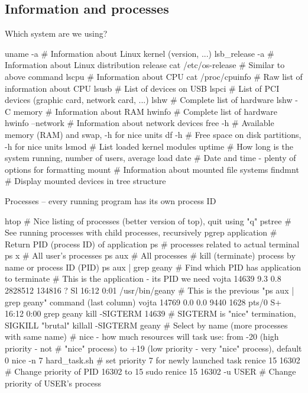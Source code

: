 \documentclass[compress, ucs, xelatex, 11pt, xcolor=svgnames,
  hyperref={
    bookmarks=true,
    unicode=true,
    colorlinks=true,
    pdftitle={Linux, command line and MetaCentrum},
    plainpages=false,
    pdfauthor={Vojtech Zeisek},
    pdfsubject={Course about use of Linux command line, writing shell scripts and using MetaCentrum of CESNET},
    pdfcreator={XeLaTeX},
    pdfkeywords={Linux, GNU, BASH, shell, command line, MetaCentrum},
    linkcolor=DarkRed,
    anchorcolor=DarkBlue,
    citecolor=Indigo,
    filecolor=NavyBlue,
    menucolor=DarkMagenta,
    urlcolor=DarkBlue,
    pdftex},
  url={hyphens, lowtilde} %
  ]{beamer}
\begin{document}
\subsection{Information and processes}

\begin{frame}[fragile]{Which system are we using?}
  \begin{bashcode}
    uname -a # Information about Linux kernel (version, ...)
    lsb_release -a # Information about Linux distribution release
    cat /etc/os-release # Similar to above command
    lscpu # Information about CPU
    cat /proc/cpuinfo # Raw list of information about CPU
    lsusb # List of devices on USB
    lspci # List of PCI devices (graphic card, network card, ...)
    lshw # Complete list of hardware
    lshw -C memory # Information about RAM
    hwinfo # Complete list of hardware
    hwinfo --network # Information about network devices
    free -h # Available memory (RAM) and swap, -h for nice units
    df -h # Free space on disk partitions, -h for nice units
    lsmod # List loaded kernel modules
    uptime # How long is the system running, number of users, average load
    date # Date and time - plenty of options for formatting
    mount # Information about mounted file systems
    findmnt # Display mounted devices in tree structure
  \end{bashcode}
\end{frame}

\begin{frame}[fragile]{Processes -- every running program has its own process ID}
  \begin{bashcode}
    htop # Nice listing of processes (better version of top), quit using "q"
    pstree # See running processes with child processes, recursively
    pgrep application # Return PID (process ID) of application
    ps # processes related to actual terminal
    ps x # All user's processes
    ps aux # All processes
    # kill (terminate) process by name or process ID (PID)
    ps aux | grep geany # Find which PID has application to terminate
    # This is the application - its PID we need
    vojta 14639 9.3 0.8 2828512 134816 ?   Sl 16:12 0:01 /usr/bin/geany
    # This is the previous "ps aux | grep geany" command (last column)
    vojta 14769 0.0 0.0   9440  1628 pts/0 S+ 16:12 0:00 grep geany
    kill -SIGTERM 14639 # SIGTERM is "nice" termination, SIGKILL "brutal"
    killall -SIGTERM geany # Select by name (more processes with same name)
    # nice - how much resources will task use: from -20 (high priority - not
    # "nice" process) to +19 (low priority - very "nice" process), default 0
    nice -n 7 hard_task.sh # set priority 7 for newly launched task
    renice 15 16302 # Change priority of PID 16302 to 15
    sudo renice 15 16302 -u USER # Change priority of USER's process
  \end{bashcode}
\end{frame}
\end{document}
